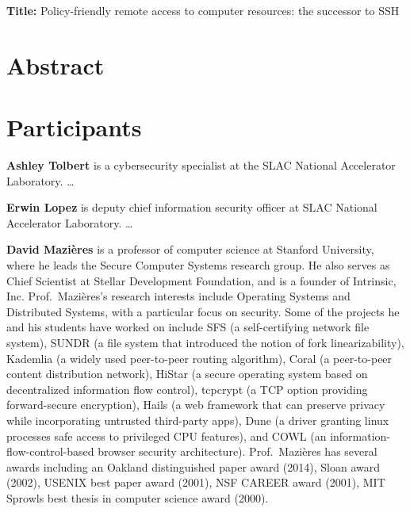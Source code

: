 \documentclass[11pt]{article}
\newcommand{\slim}{\vspace{\baselineskip}}
\begin{document}
\noindent \textbf{Title:} Policy-friendly remote access to computer resources: the successor to SSH

\section*{Abstract}

\section{Participants}

\noindent \textbf{Ashley Tolbert} is a cybersecurity specialist at the SLAC
National Accelerator Laboratory. \ldots

\slim

\noindent \textbf{Erwin Lopez} is deputy chief information security officer at
SLAC National Accelerator Laboratory. \ldots

\slim

\noindent \textbf{David Mazi\`{e}res} is a professor of computer
science at Stanford University, where he leads the Secure Computer
Systems research group. He also serves as Chief Scientist at Stellar
Development Foundation, and is a founder of Intrinsic,
Inc. Prof.~Mazi\`{e}res's research interests include Operating Systems
and Distributed Systems, with a particular focus on security. Some of
the projects he and his students have worked on include SFS (a
self-certifying network file system), SUNDR (a file system that
introduced the notion of fork linearizability), Kademlia (a widely
used peer-to-peer routing algorithm), Coral (a peer-to-peer content
distribution network), HiStar (a secure operating system based on
decentralized information flow control), tcpcrypt (a TCP option
providing forward-secure encryption), Hails (a web framework that can
preserve privacy while incorporating untrusted third-party apps), Dune
(a driver granting linux processes safe access to privileged CPU
features), and COWL (an information-flow-control-based browser
security architecture). Prof.~Mazi\`{e}res has several awards
including an Oakland distinguished paper award (2014), Sloan award
(2002), USENIX best paper award (2001), NSF CAREER award (2001), MIT
Sprowls best thesis in computer science award (2000).

\slim
\end{document}
